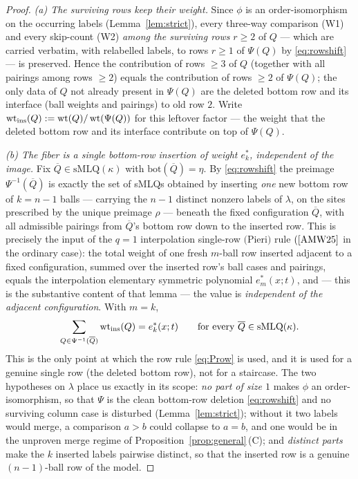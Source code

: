 \begin{proof}
\emph{(a) The surviving rows keep their weight.} Since $\phi$ is an order-isomorphism
on the occurring labels (Lemma~\ref{lem:strict}), every three-way comparison (W1) and
every skip-count (W2) \emph{among the surviving rows} $r\ge2$ of $Q$ --- which are
carried verbatim, with relabelled labels, to rows $r\ge1$ of $\Psi(Q)$ by
\eqref{eq:rowshift} --- is preserved. Hence the contribution of rows $\ge3$ of $Q$
(together with all pairings among rows $\ge2$) equals the contribution of rows
$\ge2$ of $\Psi(Q)$; the only data of $Q$ not already present in $\Psi(Q)$ are the
deleted bottom row and its interface (ball weights and pairings) to old row $2$.
Write $\operatorname{wt}_{\mathrm{ins}}(Q):=\operatorname{wt}(Q)/\operatorname{wt}(\Psi(Q))$ for this
leftover factor --- the weight that the deleted bottom row and its interface
contribute on top of $\Psi(Q)$.

\emph{(b) The fiber is a single bottom-row insertion of weight $e^*_k$, independent of
the image.} Fix $\overline Q\in\mathrm{sMLQ}(\kappa)$ with $\mathrm{bot}(\overline Q)=\eta$.
By \eqref{eq:rowshift} the preimage $\Psi^{-1}(\overline Q)$ is exactly the set of
sMLQs obtained by inserting \emph{one} new bottom row of $k=n-1$ balls --- carrying the
$n-1$ distinct nonzero labels of $\lambda$, on the sites prescribed by the unique
preimage $\rho$ --- beneath the fixed configuration $\overline Q$, with all admissible
pairings from $\overline Q$'s bottom row down to the inserted row. This is precisely the
input of the $q=1$ interpolation single-row $($Pieri$)$ rule
\cite[Lem.~5.6]{BDW25a} $(\cite[Lem.~5.4]{AMW25}$ in the ordinary case$)$: the total
weight of one fresh $m$-ball row inserted adjacent to a fixed configuration, summed
over the inserted row's ball cases and pairings, equals the interpolation elementary
symmetric polynomial $e^*_m(x;t)$, and --- this is the substantive content of that
lemma --- the value is \emph{independent of the adjacent configuration}. With $m=k$,
\begin{equation}\label{eq:fibertop}
\sum_{Q\in\Psi^{-1}(\overline Q)}\operatorname{wt}_{\mathrm{ins}}(Q)=e^*_k(x;t)
\qquad\text{for every }\overline Q\in\mathrm{sMLQ}(\kappa).
\end{equation}
This is the only point at which the row rule \eqref{eq:Prow} is used, and it is used
for a genuine single row (the deleted bottom row), not for a staircase. The two
hypotheses on $\lambda$ place us exactly in its scope: \emph{no part of size $1$}
makes $\phi$ an order-isomorphism, so that $\Psi$ is the clean bottom-row deletion
\eqref{eq:rowshift} and no surviving column case is disturbed (Lemma~\ref{lem:strict});
without it two labels would merge, a comparison $a>b$ could collapse to $a=b$, and one
would be in the unproven merge regime of Proposition~\ref{prop:general}\,\textup{(C)};
and \emph{distinct parts} make the $k$ inserted labels pairwise distinct, so that the
inserted row is a genuine $(n-1)$-ball row of the model.


\end{proof}

